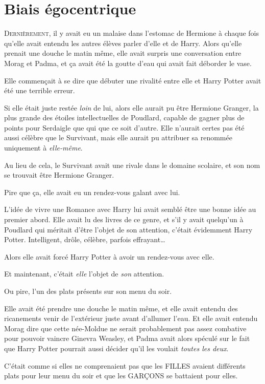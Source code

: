 \chapter{Biais égocentrique}

\lettrine{D}{ernièrement}, il y avait eu un malaise dans l'estomac de Hermione à chaque fois qu'elle avait entendu les autres élèves parler d'elle et de Harry. Alors qu'elle prenait une douche le matin même, elle avait surpris une conversation entre Morag et Padma, et ça avait été la goutte d'eau qui avait fait déborder le vase.

Elle commençait à se dire que débuter une rivalité entre elle et Harry Potter avait été une terrible erreur.

Si elle était juste restée \emph{loin} de lui, alors elle aurait pu être Hermione Granger, la plus grande des étoiles intellectuelles de Poudlard, capable de gagner plus de points pour Serdaigle que qui que ce soit d'autre. Elle n'aurait certes pas été aussi célèbre que le Survivant, mais elle aurait pu attribuer sa renommée uniquement à \emph{elle-même}.

Au lieu de cela, le Survivant avait une rivale dans le domaine scolaire, et son nom se trouvait être Hermione Granger.

Pire que ça, elle avait eu un rendez-vous galant avec lui.

L'idée de vivre une Romance avec Harry lui avait semblé être une bonne idée au premier abord. Elle avait lu des livres de ce genre, et s'il y avait quelqu'un à Poudlard qui méritait d'être l'objet de son attention, c'était évidemment Harry Potter. Intelligent, drôle, célèbre, parfois effrayant…

Alors elle avait forcé Harry Potter à avoir un rendez-vous avec elle.

Et maintenant, c'était \emph{elle} l'objet de \emph{son} attention.

Ou pire, l'un des plats présents sur son menu du soir.

Elle avait été prendre une douche le matin même, et elle avait entendu des ricanements venir de l'extérieur juste avant d'allumer l'eau. Et elle avait entendu Morag dire que cette née-Moldue ne serait probablement pas assez combative pour pouvoir vaincre Ginevra Weasley, et Padma avait alors spéculé sur le fait que Harry Potter pourrait aussi décider qu'il les voulait \emph{toutes les deux}.

C'était comme si elles ne comprenaient pas que les FILLES avaient différents plats pour leur menu du soir et que les GARÇONS se battaient pour elles.

